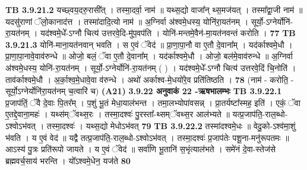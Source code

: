 \documentclass[17pt]{extarticle}
\begin{document}
{{{{{{{{{{{{{{{{{{{{{{                  \newline
                                \textbf{ TB 3.9.21.2} \newline
                  यच्छ्वय॒दरु॒रासी᳚त् । तस्मा॒दर्वा॒ नाम॑ ॥ यथ्स॒द्यो वाजा᳚न् थ्स॒मज॑यत् । तस्मा᳚द्वा॒जी नाम॑ ॥ यदसु॑राणां ॅलो॒कानाद॑त्त । तस्मा॑दादि॒त्यो नाम॑ ॥ अ॒ग्निर्वा अ॑श्वमे॒धस्य॒ योनि॑रा॒यत॑नम् । सूर्यो॒-ऽग्नेर्योनि॑-रा॒यत॑नम् । यद॑श्वमे॒धे᳚-ऽग्नौ चित्य॑ उत्तरवे॒दि-मु॑प॒वप॑ति । योनि॑-मन्तमे॒वैन॑-मा॒यत॑नवन्तं करोति । \textbf{ 77} \newline
                  \newline
                                \textbf{ TB 3.9.21.3} \newline
                  योनि॑-माना॒यत॑नवान् भवति । स ए॒वं ॅवेद॑ ॥ प्रा॒णा॒पा॒नौ वा ए॒तौ दे॒वाना᳚म् । यद॑र्काश्वमे॒धौ । प्रा॒णा॒पा॒नावे॒वाव॑रुन्धे ॥ ओजो॒ बलं॒ ॅवा ए॒तौ दे॒वाना᳚म् । यद॑र्काश्वमे॒धौ । ओजो॒ बल॑मे॒वाव॑रुन्धे ॥ अ॒ग्निर्वा अ॑श्वमे॒धस्य॒ योनि॑-रा॒यत॑नम् । सूर्यो॒-ऽग्नेर्योनि॑-रा॒यत॑नम् ( ) । यद॑श्वमे॒धे᳚-ऽग्नौ चित्य॑ उत्तरवे॒दिं चि॒नोति॑ । ताव॑र्काश्वमे॒धौ । अ॒र्का॒श्व॒मे॒धावे॒वा व॑रुन्धे । अथो॑ अर्काश्व-मे॒धयो॑रे॒व प्रति॑तिष्ठति । \textbf{ 78} \newline
                  \newline
                                    (नाम॑ - करोति॒ - सूर्यो॒ऽग्नेर्योनि॑रा॒यत॑नम् च॒त्वारि॑ च) \textbf{(A21)} \newline \newline
                \textbf{ 3.9.22    अनुवाकं   22 -ऋषभालम्भः} \newline
                                \textbf{ TB 3.9.22.1} \newline
                  प्र॒जाप॑तिं॒ ॅवै दे॒वाः पि॒तर᳚म् । प॒शुं भू॒तं मेधा॒याल॑भन्त । तमा॒लभ्योपा॑वसन्न् । प्रा॒तर्यष्टा᳚स्मह॒ इति॑ । एकं॒ ॅवा ए॒तद्दे॒वाना॒महः॑ । यथ्स॑म्ॅवथ्स॒रः । तस्मा॒दश्वः॑ पु॒रस्ता᳚-थ्सम्ॅवथ्स॒र आल॑भ्यते ॥ यत्प्र॒जाप॑ति॒-राल॒ब्धो-ऽश्वोऽभ॑वत् । तस्मा॒दश्वः॑ । यथ्स॒द्यो मेधोऽभ॑वत् \textbf{ 79} \newline
                  \newline
                                \textbf{ TB 3.9.22.2} \newline
                  तस्मा॑दश्वमे॒धः ॥ वेदु॒को-ऽश्व॑मा॒शुं भ॑वति । य ए॒वं वेद॑ ॥ यद्वै तत्प्र॒जाप॑ति॒-राल॒ब्धो-ऽश्वोऽभ॑वत् । तस्मा॒दश्वः॑ प्र॒जाप॑तेः पशू॒ना-मनु॑रूपतमः ॥ आऽस्य॑ पु॒त्रः प्रति॑रूपो जायते । य ए॒वं ॅवेद॑ ॥ सर्वा॑णि भू॒तानि॑ स॒भृंत्याल॑भते । समे॑नं दे॒वा-स्तेज॑से ब्रह्मवर्च॒साय॑ भरन्ति । यो᳚ऽश्वमे॒धेन॒ यज॑ते \textbf{ 80} \newline
}}}}}}}}}}}}}}}}}}}}}}
\end{document}
